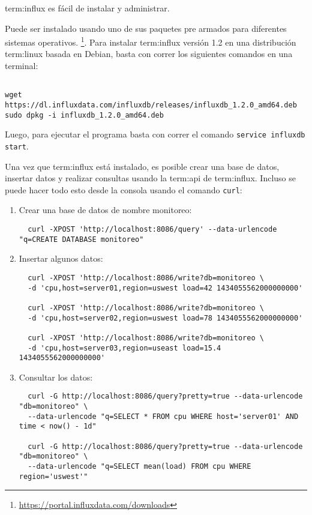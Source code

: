 \gls{term:influx} es fácil de instalar y administrar.

Puede ser instalado usando uno de sus paquetes pre armados para diferentes
sistemas operativos. \footnote{\url{https://portal.influxdata.com/downloads}}.
Para instalar \gls{term:influx} versión 1.2 en una distribución
\gls{term:linux} basada en Debian, basta con correr los siguientes comandos en
una terminal:

\begin{lstlisting}

wget https://dl.influxdata.com/influxdb/releases/influxdb_1.2.0_amd64.deb
sudo dpkg -i influxdb_1.2.0_amd64.deb

\end{lstlisting}

Luego, para ejecutar el programa basta con correr el comando
\lstinline{service influxdb start}.

Una vez que \gls{term:influx} está instalado, es posible crear una base de
datos, insertar datos y realizar consultas usando la \gls{term:api} de
\gls{term:influx}. Incluso se puede hacer todo esto desde la consola usando el
comando \lstinline{curl}:

\begin{enumerate}
  \item{Crear una base de datos de nombre monitoreo:}
  \begin{lstlisting}
  curl -XPOST 'http://localhost:8086/query' --data-urlencode "q=CREATE DATABASE monitoreo"
  \end{lstlisting}

  \item{Insertar algunos datos:}
  \begin{lstlisting}
  curl -XPOST 'http://localhost:8086/write?db=monitoreo \
  -d 'cpu,host=server01,region=uswest load=42 1434055562000000000'

  curl -XPOST 'http://localhost:8086/write?db=monitoreo \
  -d 'cpu,host=server02,region=uswest load=78 1434055562000000000'

  curl -XPOST 'http://localhost:8086/write?db=monitoreo \
  -d 'cpu,host=server03,region=useast load=15.4 1434055562000000000'
  \end{lstlisting}


  \item{Consultar los datos:}
  \begin{lstlisting}
  curl -G http://localhost:8086/query?pretty=true --data-urlencode "db=monitoreo" \
  --data-urlencode "q=SELECT * FROM cpu WHERE host='server01' AND time < now() - 1d"

  curl -G http://localhost:8086/query?pretty=true --data-urlencode "db=monitoreo" \
  --data-urlencode "q=SELECT mean(load) FROM cpu WHERE region='uswest'"
  \end{lstlisting}
\end{enumerate}

